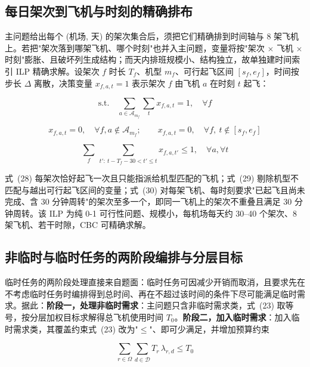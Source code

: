 \documentclass[zihao=-4,a4paper]{ctexart}
\begin{document}
\subsection{每日架次到飞机与时刻的精确排布}

主问题给出每个 (机场, 天) 的架次集合后，须把它们精确排到时间轴与 8 架飞机上。若把"架次落到哪架飞机、哪个时刻"也并入主问题，变量将按"架次 $\times$ 飞机 $\times$ 时刻"膨胀、且破坏列生成结构；而天内排班规模小、结构独立，故单独建时间索引 ILP 精确求解。设架次 $f$ 时长 $T_f$、机型 $m_f$、可行起飞区间 $[s_f,e_f]$，时间按步长 $\Delta$ 离散，决策变量 $x_{f,a,t}=1$ 表示架次 $f$ 由飞机 $a$ 在时刻 $t$ 起飞：

\begin{equation}
  \text{s.t.}\quad \sum_{a\in\mathcal{A}_{m_f}}\sum_{t} x_{f,a,t} = 1,\quad \forall f
\end{equation}

\begin{equation}
  x_{f,a,t}=0,\quad \forall f,a\notin\mathcal{A}_{m_f};\qquad x_{f,a,t}=0,\quad \forall f,\ t\notin[s_f,e_f]
\end{equation}

\begin{equation}
  \sum_{f}\ \sum_{t':\ t-T_f-30 < t'\le t} x_{f,a,t'} \le 1,\quad \forall a,\forall t
\end{equation}

式~(28) 每架次恰好起飞一次且只能指派给机型匹配的飞机；式~(29) 剔除机型不匹配与越出可行起飞区间的变量；式~(30) 对每架飞机、每时刻要求"已起飞且尚未完成、含 30 分钟周转"的架次至多一个，即同一飞机上的架次不重叠且满足 30 分钟周转。该 ILP 为纯 0-1 可行性问题、规模小，每机场每天约 30--40 个架次、8 架飞机、若干时隙，CBC 可精确求解。

\subsection{非临时与临时任务的两阶段编排与分层目标}

临时任务的两阶段处理直接来自题面：临时任务可因减少开销而取消，且要求先在不考虑临时任务时编排得到总时间、再在不超过该时间的条件下尽可能满足临时需求。据此：\textbf{阶段一，处理非临时需求}：主问题只含非临时需求类，式~(23) 取等号，按分层加权目标求解得总飞机使用时间 $T_0$。\textbf{阶段二，加入临时需求}：加入临时需求类，其覆盖约束式~(23) 改为"$\le$"、即可少满足，并增加预算约束

\begin{equation}
  \sum_{r\in\Omega}\sum_{d\in\mathcal{D}} T_r\,\lambda_{r,d} \le T_0
\end{equation}
\end{document}
